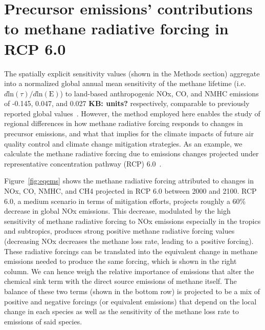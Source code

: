 \section{Precursor emissions' contributions to methane radiative forcing in RCP 6.0}

The spatially explicit sensitivity values (shown in the Methods section) aggregate into a normalized global annual mean sensitivity of the methane lifetime (i.e. $d \mathrm{ln}(\tau)/d\mathrm{ln}(\mathrm{E})$) to land-based anthropogenic NOx, CO, and NMHC emissions of -0.145, 0.047, and 0.027 \textbf{KB: units?} respectively, comparable to previously reported global values~\citep{ref:fry2012,ref:holmes2013}. However, the method employed here enables the study of regional differences in how methane radiative forcing responds to changes in precursor emissions, and what that implies for the climate impacts of future air quality control and climate change mitigation strategies. As an example, we calculate the methane radiative forcing due to emissions changes projected under representative concentration pathway (RCP) 6.0~\citep{ref:vanvuuren2011}.

Figure~\ref{fig:eqems} shows the methane radiative forcing attributed to changes in NOx, CO, NMHC, and CH4 projected in RCP 6.0 between 2000 and 2100. RCP 6.0, a medium scenario in terms of mitigation efforts, projects roughly a 60\% decrease in global NOx emissions. This decrease, modulated by the high sensitivity of methane radiative forcing to NOx emissions especially in the tropics and subtropics, produces strong positive methane radiative forcing values (decreasing NOx decreases the methane loss rate, leading to a positive forcing). These radiative forcings can be translated into the equivalent change in methane emissions needed to produce the same forcing, which is shown in the right column. We can hence weigh the relative importance of emissions that alter the chemical sink term with the direct source emissions of methane itself. The balance of these two terms (shown in the bottom row) is projected to be a mix of positive and negative forcings (or equivalent emissions) that depend on the local change in each species as well as the sensitivity of the methane loss rate to emissions of said species.

